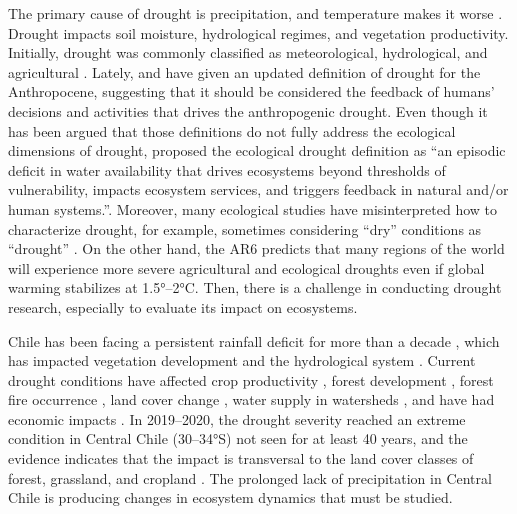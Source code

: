 \documentclass[
  authoryear,
  preprint,
  3p,
  onecolumn]{elsarticle}
\begin{document}
The primary cause of drought is precipitation, and temperature makes it
worse \citep{Luo2017}. Drought impacts soil moisture, hydrological
regimes, and vegetation productivity. Initially, drought was commonly
classified as meteorological, hydrological, and agricultural
\citep{Wilhite1985}. Lately, \citet{Loon2016} and
\citet{AghaKouchak2021} have given an updated definition of drought for
the Anthropocene, suggesting that it should be considered the feedback
of humans' decisions and activities that drives the anthropogenic
drought. Even though it has been argued that those definitions do not
fully address the ecological dimensions of drought, \citet{Crausbay2017}
proposed the ecological drought definition as ``an episodic deficit in
water availability that drives ecosystems beyond thresholds of
vulnerability, impacts ecosystem services, and triggers feedback in
natural and/or human systems.''. Moreover, many ecological studies have
misinterpreted how to characterize drought, for example, sometimes
considering ``dry'' conditions as ``drought'' \citep{Slette2019}. On the
other hand, the AR6 \citep{IPCC2023} predicts that many regions of the
world will experience more severe agricultural and ecological droughts
even if global warming stabilizes at 1.5°--2°C. Then, there is a
challenge in conducting drought research, especially to evaluate its
impact on ecosystems.

Chile has been facing a persistent rainfall deficit for more than a
decade \citep{Garreaud2017}, which has impacted vegetation development
\citep{Zambrano2023} and the hydrological system \citep{Boisier2018}.
Current drought conditions have affected crop productivity
\citep{Zambrano2016, Zambrano2018}, forest development
\citep{Miranda2020, Venegas2018}, forest fire occurrence
\citep{UrrutiaJalabert2018}, land cover change \citep{Fuentes2021},
water supply in watersheds \citep{AlvarezGarreton2021}, and have had
economic impacts \citep{Fernandez2023}. In 2019--2020, the drought
severity reached an extreme condition in Central Chile (30--34°S) not
seen for at least 40 years, and the evidence indicates that the impact
is transversal to the land cover classes of forest, grassland, and
cropland \citep{Zambrano2023}. The prolonged lack of precipitation in
Central Chile is producing changes in ecosystem dynamics that must be
studied.
\end{document}
